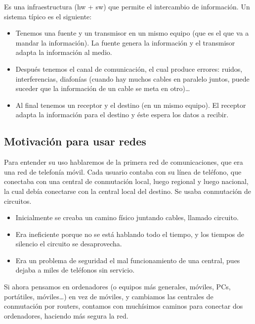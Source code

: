 \begin{definicion}
    Es una infraestructura (hw + sw) que permite el intercambio de información. Un sistema típico es el siguiente:
    \begin{itemize}
        \item Tenemos una fuente y un transmisor en un mismo equipo (que es el que va a mandar la información). La fuente genera la información y el transmisor adapta la información al medio.
        \item Después tenemos el canal de comunicación, el cual produce errores: ruidos, interferencias, diafonías (cuando hay muchos cables en paralelo juntos, puede suceder que la información de un cable se meta en otro)\ldots
        \item Al final tenemos un receptor y el destino (en un mismo equipo). El receptor adapta la información para el destino y éste espera los datos a recibir. 
    \end{itemize}
\end{definicion}


\subsection{Motivación para usar redes}
Para entender su uso hablaremos de la primera red de comunicaciones, que era una red de telefonía móvil. 
Cada usuario contaba con su línea de teléfono, que conectaba con una central de conmutación local, luego regional y luego nacional, la cual debía conectarse con la central local del destino. Se usaba conmutación de circuitos. 
\begin{itemize}
    \item Inicialmente se creaba un camino físico juntando cables, llamado circuito. 
    \item Era ineficiente porque no se está hablando todo el tiempo, y los tiempos de silencio el circuito se desaprovecha. 
    \item Era un problema de seguridad el mal funcionamiento de una central, pues dejaba a miles de teléfonos sin servicio. 
\end{itemize}

Si ahora pensamos en ordenadores (o equipos más generales, móviles, PCs, portátiles, móviles\ldots) en vez de móviles, y cambiamos las centrales de conmutación por routers, contamos con muchísimos caminos para conectar dos ordenadores, haciendo más segura la red.\\

